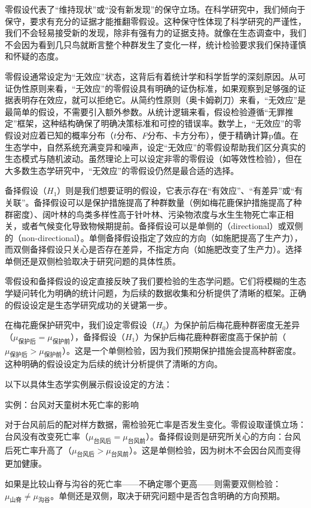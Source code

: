 \documentclass[
  twoside,12pt,fontset=none]{ctexbook}
\renewenvironment{quote}{%
  \def\FrameCommand{{\color{quote-border}\vrule width 4pt}\hspace{10pt}}%
  \MakeFramed {\advance\hsize-\width \FrameRestore\noindent\ignorespaces}%
}{%
  \endMakeFramed
}
\begin{document}
零假设代表了``维持现状''或``没有新发现''的保守立场。在科学研究中，我们倾向于保守，要求有充分的证据才能推翻零假设。这种保守性体现了科学研究的严谨性，我们不会轻易接受新的发现，除非有强有力的证据支持。就像在生态调查中，我们不会因为看到几只鸟就断言整个种群发生了变化一样，统计检验要求我们保持谨慎和怀疑的态度。

零假设通常设定为``无效应''状态，这背后有着统计学和科学哲学的深刻原因。从可证伪性原则来看，``无效应''的零假设具有明确的证伪标准，如果观察到足够强的证据表明存在效应，就可以拒绝它。从简约性原则（奥卡姆剃刀）来看，``无效应''是最简单的假设，不需要引入额外参数。从统计逻辑来看，假设检验遵循``无罪推定''框架，这种结构确保了明确决策标准和可控的错误率。数学上，``无效应''的零假设对应着已知的概率分布（\(t\)分布、\emph{F}分布、卡方分布），便于精确计算p值。在生态学中，自然系统充满变异和噪声，设定``无效应''的零假设帮助我们区分真实的生态模式与随机波动。虽然理论上可以设定非零的零假设（如等效性检验），但在大多数生态学研究中，``无效应''的零假设仍然是最合适的选择。

备择假设（\(H_1\)）则是我们想要证明的假设，它表示存在``有效应''、``有差异''或``有关联''。备择假设可以是保护措施提高了种群数量（例如梅花鹿保护措施提高了种群密度）、阔叶林的鸟类多样性高于针叶林、污染物浓度与水生生物死亡率正相关，或者气候变化导致物候期提前。备择假设可以是单侧的（directional）或双侧的（non-directional）。单侧备择假设指定了效应的方向（如施肥提高了生产力），而双侧备择假设只关心是否存在差异，不指定方向（如施肥改变了生产力）。选择单侧还是双侧检验取决于研究问题的具体性质。

零假设和备择假设的设定直接反映了我们要检验的生态学问题。它们将模糊的生态学疑问转化为明确的统计问题，为后续的数据收集和分析提供了清晰的框架。正确的假设设定是生态学研究成功的关键第一步。

在梅花鹿保护研究中，我们设定零假设（\(H_0\)）为保护前后梅花鹿种群密度无差异（\(\mu_{\text{保护后}} = \mu_{\text{保护前}}\)），备择假设（\(H_1\)）为保护后梅花鹿种群密度高于保护前（\(\mu_{\text{保护后}} > \mu_{\text{保护前}}\)）。这是一个单侧检验，因为我们预期保护措施会提高种群密度。这种明确的假设设定为后续的统计分析提供了清晰的方向。

以下以具体生态学实例展示假设设定的方法：

\begin{quote}
实例：台风对天童树木死亡率的影响

对于台风前后的配对样方数据，需检验死亡率是否发生变化。零假设取谨慎立场：台风没有改变死亡率（\(\mu_{\text{台风后}} = \mu_{\text{台风前}}\)）。备择假设则是研究所关心的方向：台风后死亡率升高了（\(\mu_{\text{台风后}} > \mu_{\text{台风前}}\)）。这是单侧检验，因为树木不会因台风而变得更加健康。

如果是比较山脊与沟谷的死亡率------不确定哪个更高------则需要双侧检验：\(\mu_{\text{山脊}} \neq \mu_{\text{沟谷}}\)。单侧还是双侧，取决于研究问题中是否包含明确的方向预期。
\end{quote}
\end{document}
